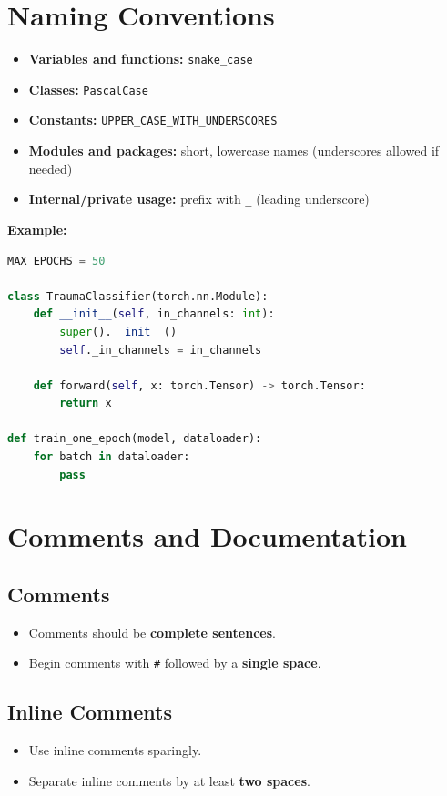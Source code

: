 \documentclass[11pt]{article}
\begin{document}
\section{Naming Conventions}

\begin{itemize}[label={-},leftmargin=2em,labelsep=0.6em,itemsep=0.2em]
  \item \textbf{Variables and functions:} \texttt{snake\_case}
  \item \textbf{Classes:} \texttt{PascalCase}
  \item \textbf{Constants:} \texttt{UPPER\_CASE\_WITH\_UNDERSCORES}
  \item \textbf{Modules and packages:} short, lowercase names (underscores allowed if needed)
  \item \textbf{Internal/private usage:} prefix with \texttt{\_} (leading underscore)
\end{itemize}

\textbf{Example:}
\begin{lstlisting}[language=Python]
MAX_EPOCHS = 50

class TraumaClassifier(torch.nn.Module):
    def __init__(self, in_channels: int):
        super().__init__()
        self._in_channels = in_channels

    def forward(self, x: torch.Tensor) -> torch.Tensor:
        return x

def train_one_epoch(model, dataloader):
    for batch in dataloader:
        pass
\end{lstlisting}

\section{Comments and Documentation}

\subsection{Comments}
\begin{itemize}[label={-},leftmargin=2em,labelsep=0.6em,itemsep=0.2em]
  \item Comments should be \textbf{complete sentences}.
  \item Begin comments with \texttt{\#} followed by a \textbf{single space}.
\end{itemize}

\subsection{Inline Comments}
\begin{itemize}[label={-},leftmargin=2em,labelsep=0.6em,itemsep=0.2em]
  \item Use inline comments sparingly.
  \item Separate inline comments by at least \textbf{two spaces}.
\end{itemize}
\end{document}
